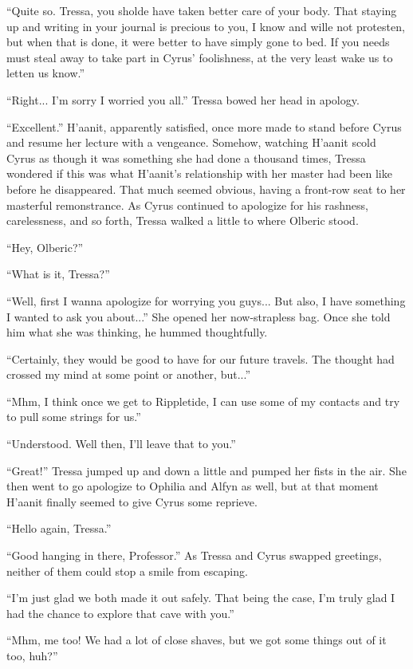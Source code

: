 ``Quite so. Tressa, you sholde have taken better care of your body. That staying up and writing in your journal is precious to you, I know and wille not protesten, but when that is done, it were better to have simply gone to bed. If you needs must steal away to take part in Cyrus' foolishness, at the very least wake us to letten us know.''

``Right... I'm sorry I worried you all.'' Tressa bowed her head in apology.

``Excellent.'' H'aanit, apparently satisfied, once more made to stand before Cyrus and resume her lecture with a vengeance. Somehow, watching H'aanit scold Cyrus as though it was something she had done a thousand times, Tressa wondered if this was what H'aanit's relationship with her master had been like before he disappeared. That much seemed obvious, having a front-row seat to her masterful remonstrance. As Cyrus continued to apologize for his rashness, carelessness, and so forth, Tressa walked a little to where Olberic stood.

``Hey, Olberic?''

``What is it, Tressa?''

``Well, first I wanna apologize for worrying you guys... But also, I have something I wanted to ask you about...'' She opened her now-strapless bag. Once she told him what she was thinking, he hummed thoughtfully.

``Certainly, they would be good to have for our future travels. The thought had crossed my mind at some point or another, but...''

``Mhm, I think once we get to Rippletide, I can use some of my contacts and try to pull some strings for us.''

``Understood. Well then, I'll leave that to you.''

``Great!'' Tressa jumped up and down a little and pumped her fists in the air. She then went to go apologize to Ophilia and Alfyn as well, but at that moment H'aanit finally seemed to give Cyrus some reprieve.

``Hello again, Tressa.''

``Good hanging in there, Professor.'' As Tressa and Cyrus swapped greetings, neither of them could stop a smile from escaping.

``I'm just glad we both made it out safely. That being the case, I'm truly glad I had the chance to explore that cave with you.''

``Mhm, me too! We had a lot of close shaves, but we got some things out of it too, huh?''

